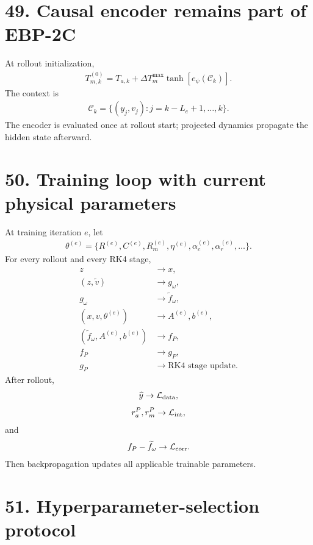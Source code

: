 \documentclass[11pt]{article}
\begin{document}
\section*{49. Causal encoder remains part of EBP-2C}

At rollout initialization,
\begin{align}
\boxed{T_{m,k}^{(0)}=T_{a,k}+\Delta T_m^{\max}\tanh[e_\psi(\mathcal C_k)].}
\tag{E5.190}
\end{align}
The context is
\begin{align}
\boxed{\mathcal C_k=\{(y_j,v_j):j=k-L_e+1,\ldots,k\}.}
\tag{E5.191}
\end{align}
The encoder is evaluated once at rollout start; projected dynamics propagate the hidden state afterward.

\section*{50. Training loop with current physical parameters}

At training iteration \(e\), let
\begin{align}
\boxed{\theta^{(e)}=\{R^{(e)},C^{(e)},R_m^{(e)},\eta^{(e)},\alpha_c^{(e)},\alpha_r^{(e)},\ldots\}.}
\tag{E5.192}
\end{align}
For every rollout and every RK4 stage,
\begin{align}
z&\rightarrow x,\\
(z,\widetilde v)&\rightarrow g_\omega,\\
g_\omega&\rightarrow\widetilde f_\omega,\\
(x,v,\theta^{(e)})&\rightarrow A^{(e)},b^{(e)},\\
(\widetilde f_\omega,A^{(e)},b^{(e)})&\rightarrow f_P,\\
f_P&\rightarrow g_P,\\
g_P&\rightarrow\text{RK4 stage update}.
\end{align}
After rollout,
\begin{align}
\widehat y\rightarrow\mathcal L_{\rm data},
\end{align}
\begin{align}
r_a^P,r_m^P\rightarrow\mathcal L_{\rm int},
\end{align}
and
\begin{align}
f_P-\widetilde f_\omega\rightarrow\mathcal L_{\rm corr}.
\end{align}
Then backpropagation updates all applicable trainable parameters.

\section*{51. Hyperparameter-selection protocol}
\end{document}
